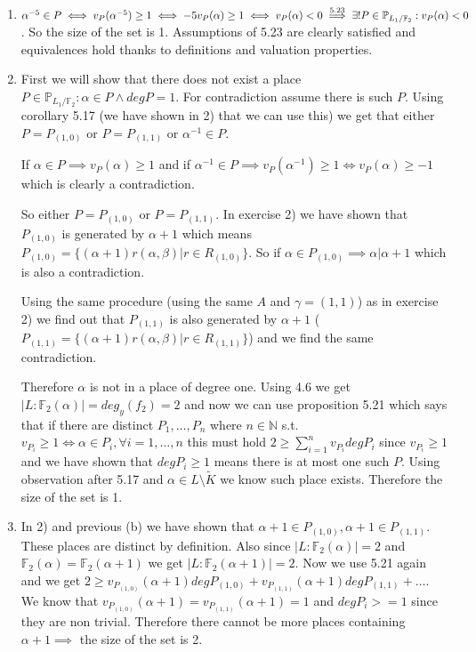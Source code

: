\documentclass[12pt, a4paper]{article}
\begin{document}
\section{}
\begin{enumerate}[label=(\alph*)]
\item $\alpha^{-5} \in P \iff v_P(\alpha^{-5})\geq 1 \iff -5v_P(\alpha)\geq 1 \iff v_P(\alpha) < 0 \stackrel{\text{5.23}}{\implies} \\\exists! P \in \mathbb{P}_{L_1/\mathbb{F}_2} : v_P(\alpha)<0$. So the size of the set is 1. Assumptions of 5.23 are clearly satisfied and equivalences hold thanks to definitions and valuation properties.

\item First we will show that there does not exist a place $P \in \mathbb{P}_{L_1/\mathbb{F}_2}: \alpha \in P \land deg P = 1$. For contradiction assume there is such $P$. Using corollary 5.17 (we have shown in 2) that we can use this) we get that either $P = P_{(1,0)}$ or $P = P_{(1,1)}$ or $\alpha^{-1} \in P$. 

If $\alpha \in P \implies v_P(\alpha)\geq 1$ and if $\alpha^{-1} \in P \implies v_P(\alpha^{-1}) \geq 1 \iff v_P(\alpha) \geq -1$ which is clearly a contradiction. 

So either $P = P_{(1,0)}$ or $P = P_{(1,1)}$. In exercise 2) we have shown that $P_{(1,0)}$ is generated by $\alpha+1$ which means $P_{(1,0)}=\{(\alpha+1)r(\alpha,\beta)|r\in R_{(1,0)}\}$. So if $\alpha \in P_{(1,0)} \implies \alpha | \alpha + 1$ which is also a contradiction. 

Using the same procedure (using the same $A$ and $\gamma =(1,1)$) as in exercise 2) we find out that $P_{(1,1)}$ is also generated by $\alpha+1$ ($P_{(1,1)}=\{(\alpha+1)r(\alpha,\beta)|r\in R_{(1,1)}\}$) and we find the same contradiction.

Therefore $\alpha$ is not in a place of degree one. Using 4.6 we get $|L:\mathbb{F}_2(\alpha)|=deg_y(f_2)=2$ and now we can use proposition 5.21 which says that if there are distinct $P_1,\dots,P_n$ where $n\in \mathbb{N}$ s.t. $v_{P_i}\geq 1 \iff \alpha \in P_i, \forall i=1,\dots,n$ this must hold $2\geq \sum_{i=1}^n v_{P_i} deg P_i$ since $v_{P_i}\geq 1$ and we have shown that $degP_i \geq 1$ means there is at most one such $P$. Using observation after 5.17 and $\alpha \in L \setminus \tilde{K}$ we know such place exists. Therefore the size of the set is 1.

\item In 2) and previous (b) we have shown that $\alpha+1 \in P_{(1,0)}, \alpha+1 \in P_{(1,1)}$. These places are distinct by definition. Also since $|L:\mathbb{F}_2(\alpha)| = 2$ and $\mathbb{F}_2(\alpha) = \mathbb{F}_2(\alpha+1)$ we get $|L:\mathbb{F}_2(\alpha+1)| = 2$. Now we use 5.21 again and we get $2\geq v_{P_{(1,0)}}(\alpha+1)degP_{(1,0)} + v_{P_{(1,1)}}(\alpha+1)degP_{(1,1)} + \dots$. We know that $v_{P_{(1,0)}}(\alpha+1) = v_{P_{(1,1)}}(\alpha+1) = 1$ and $deg P_i >= 1$ since they are non trivial. Therefore there cannot be more places containing $\alpha+1 \implies$ the size of the set is 2.


\end{enumerate}
\end{document}
